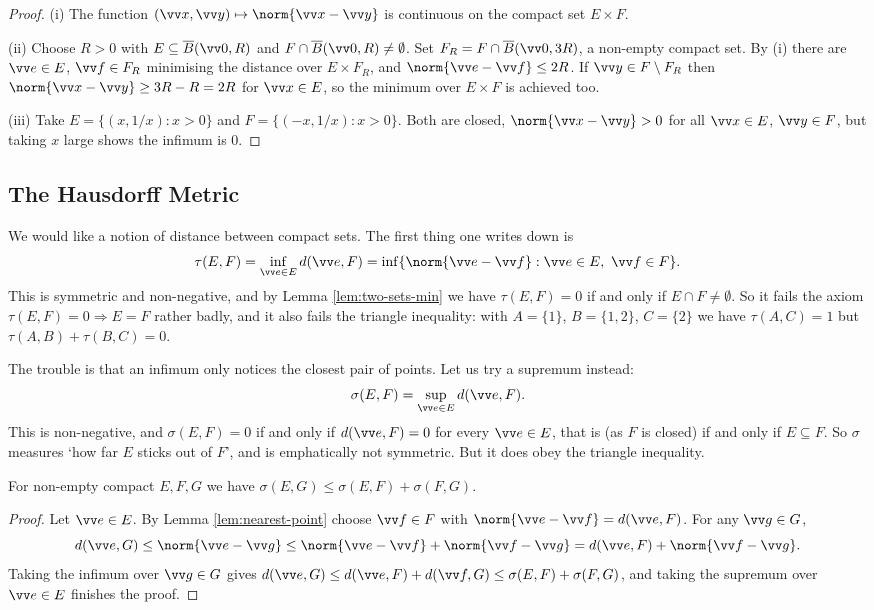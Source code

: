 \begin{proof}
	(i) The function $(\vv x,\vv y)\mapsto \norm{\vv x-\vv y}$ is continuous on the compact set $E\times F$.

	(ii) Choose $R>0$ with $E \subseteq \overline{B}(\vv 0,R)$ and $F \cap \overline{B}(\vv 0,R)\neq\emptyset$. Set $F_R = F\cap\overline{B}(\vv 0,3R)$, a non-empty compact set. By (i) there are $\vv e\in E$, $\vv f\in F_R$ minimising the distance over $E\times F_R$, and $\norm{\vv e - \vv f}\leq 2R$. If $\vv y \in F\setminus F_R$ then $\norm{\vv x-\vv y}\geq 3R - R = 2R$ for $\vv x \in E$, so the minimum over $E\times F$ is achieved too.

	(iii) Take $E = \{(x,1/x):x>0\}$ and $F = \{(-x,1/x):x>0\}$. Both are closed, $\norm{\vv x -\vv y}>0$ for all $\vv x\in E$, $\vv y \in F$, but taking $x$ large shows the infimum is $0$.
\end{proof}

\subsection{The Hausdorff Metric}

We would like a notion of distance between compact sets. The first thing one writes down is
$$\tau(E,F) = \inf_{\vv e\in E}d(\vv e,F) = \inf\{\norm{\vv e-\vv f} : \vv e\in E,\ \vv f\in F\}.$$
This is symmetric and non-negative, and by Lemma \ref{lem:two-sets-min} we have $\tau(E,F)=0$ if and only if $E\cap F\neq\emptyset$. So it fails the axiom $\tau(E,F)=0 \Rightarrow E=F$ rather badly, and it also fails the triangle inequality: with $A = \{1\}$, $B = \{1,2\}$, $C=\{2\}$ we have $\tau(A,C)=1$ but $\tau(A,B)+\tau(B,C)=0$.

The trouble is that an infimum only notices the closest pair of points. Let us try a supremum instead:
$$\sigma(E,F) = \sup_{\vv e\in E}d(\vv e,F).$$
This is non-negative, and $\sigma(E,F)=0$ if and only if $d(\vv e,F)=0$ for every $\vv e\in E$, that is (as $F$ is closed) if and only if $E \subseteq F$. So $\sigma$ measures `how far $E$ sticks out of $F$', and is emphatically not symmetric. But it does obey the triangle inequality.

\begin{lemma}\label{lem:sigma-triangle}
	For non-empty compact $E,F,G$ we have $\sigma(E,G)\leq\sigma(E,F)+\sigma(F,G)$.
\end{lemma}

\begin{proof}
	Let $\vv e\in E$. By Lemma \ref{lem:nearest-point} choose $\vv f\in F$ with $\norm{\vv e -\vv f} = d(\vv e,F)$. For any $\vv g\in G$,
	$$d(\vv e,G) \leq \norm{\vv e-\vv g}\leq\norm{\vv e-\vv f}+\norm{\vv f-\vv g} = d(\vv e,F)+\norm{\vv f-\vv g}.$$
	Taking the infimum over $\vv g\in G$ gives $d(\vv e,G)\leq d(\vv e,F)+d(\vv f,G) \leq \sigma(E,F)+\sigma(F,G)$, and taking the supremum over $\vv e \in E$ finishes the proof.
\end{proof}

